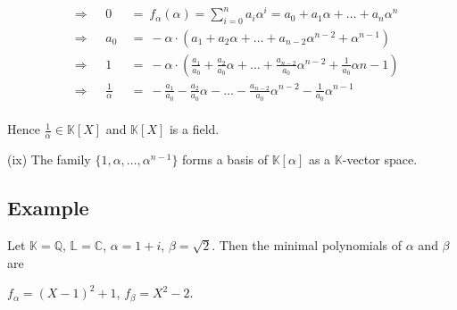 \documentclass[12pt]{book}
\begin{document}
\begin{spacing}{1.3}
\begin{compactenum}
\begin{alignat*}{5}
&\Longrightarrow \textrm{   } &0&\ =\ f_{\alpha}(\alpha)=\sum_{i=0}^n a_i \alpha^{i}=a_0 + a_1 \alpha + \dots + a_n \alpha^n\\
&\Longrightarrow \textrm{   } &a_0&\ =\ - \alpha \cdot \left(a_1+a_2 \alpha+ \dots + a_{n-2}\alpha^{n-2}+\alpha^{n-1}\right)\\
&\Longrightarrow \textrm{   } &1&\ =\ -\alpha \cdot \left(\frac{a_1}{a_0}+\frac{a_2}{a_0}\alpha+ \dots + \frac{a_{n-2}}{a_0} \alpha^{n-2}+\frac{1}{a_0} \alpha{n-1}\right)\\
&\Longrightarrow \textrm{   } &\frac{1}{\alpha}&\ =\ -\frac{a_1}{a_0}-\frac{a_2}{a_0}\alpha- \dots - \frac{a_{n-2}}{a_0} \alpha^{n-2}-\frac{1}{a_0} \alpha^{n-1}
\end{alignat*}\\[-24pt]
Hence $\frac{1}{\alpha} \in \mathbb{K}[X]$ and $\mathbb{K}[X]$ is a field.
\item[(ix)] The family $\{1,\alpha, \dots , \alpha^{n-1}\}$ forms a basis of $\mathbb{K}[\alpha]$ as a $\mathbb{K}$-vector space.
\end{compactenum}

\subsection*{Example} %
\titleformat{\subsection}{\normalfont\normalsize\bfseries}{}{0em}{#1 \thesubsection}
Let $\mathbb{K}=\mathbb{Q}$, $\mathbb{L}=\mathbb{C}$, $\alpha=1+i$, $\beta = \sqrt{2}$. Then the minimal polynomials of $\alpha$ and $\beta$ are
\begin{center}$f_{\alpha}=\left(X-1\right)^2+1$, \textrm{  } $f_{\beta}=X^2-2$.\end{center}


\end{spacing}
\end{document}
